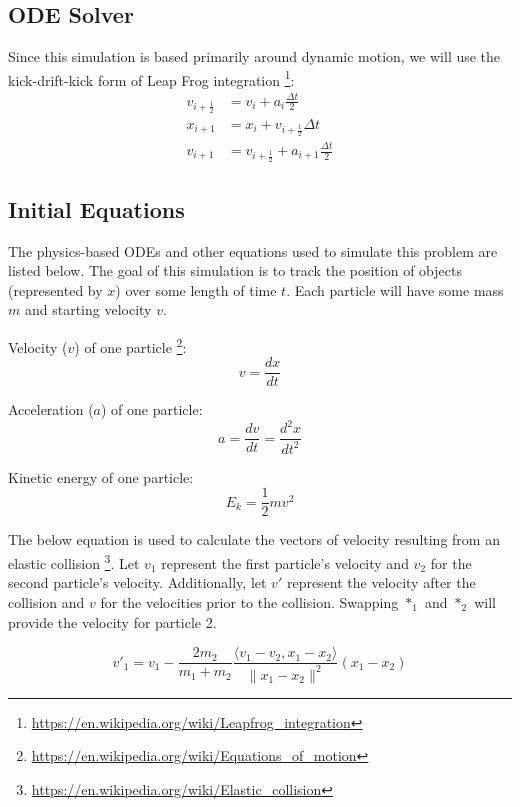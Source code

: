 \documentclass{article}
\begin{document}
\subsection{ODE Solver}
Since this simulation is based primarily around dynamic motion,
we will use the kick-drift-kick form of Leap Frog integration
\footnote{\url{https://en.wikipedia.org/wiki/Leapfrog_integration}}:
\begin{align}
    v_{i+\frac{1}{2}}&=v_{i}+a_{i}{\frac {\Delta t}{2}}\\
    x_{i+1}&=x_{i}+v_{i+\frac{1}{2}}\Delta t\\
    v_{i+1}&=v_{i+\frac{1}{2}}+a_{i+1}{\frac {\Delta t}{2}}
\end{align}

\subsection{Initial Equations}

The physics-based ODEs and other equations used to simulate this problem are listed below.
The goal of this simulation is to track the position of objects (represented by $x$)
over some length of time $t$. Each particle will have some mass $m$ and starting velocity $v$.

Velocity ($v$) of one particle
\footnote{\url{https://en.wikipedia.org/wiki/Equations_of_motion}}:
\begin{equation}
    v = \frac{dx}{dt}
\end{equation}

Acceleration ($a$) of one particle:
\begin{equation}
    a = \frac{dv}{dt} = \frac{d^2x}{dt^2}
\end{equation}

Kinetic energy of one particle:
\begin{equation}
E_k = \frac{1}{2}mv^2
\end{equation}

The below equation is used to calculate the vectors of velocity resulting from an elastic collision
\footnote{\url{https://en.wikipedia.org/wiki/Elastic_collision}}.
Let $v_1$ represent the first particle's velocity and $v_2$ for the second particle's velocity.
Additionally, let $v'$ represent the velocity after the collision and $v$ for the velocities prior to the collision.
Swapping $*_1$ and $*_2$ will provide the velocity for particle 2.

\begin{equation}
v'_1 = v_1 - \frac{2m_2}{m_1+m_2}\frac{\langle v_1 - v_2, x_1 - x_2 \rangle}{\|x_1-x_2\|^2}(x_1-x_2)
\end{equation}
\end{document}
